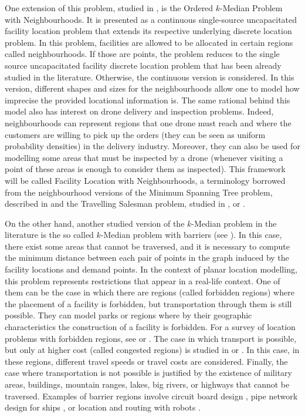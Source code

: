 \documentclass[a4paper,  review, authoryear, 1p.]{elsarticle}
\newcommand{\JP}[1]{{\color{blue}#1}}
\newcommand{\CV}[1]{{\color{blue}#1}}
\begin{document}
	\CV{One extension of this problem, studied in \cite{blanco2019}, is the Ordered $k$-Median Problem with Neighbourhoods. It} is presented as a continuous single-source uncapacitated facility location problem that extends its respective underlying discrete location problem. In this problem, facilities are allowed to be allocated in certain regions called neighbourhoods. If those are points, the problem reduces to the single source uncapacitated facility discrete location problem that has been already studied in the literature. Otherwise, the continuous version is considered. In this version, different shapes and sizes for the neighbourhoods allow one to model how imprecise the provided locational information is. \JP{The same rational behind this model also has interest on drone delivery and inspection problems. Indeed, neighbourhoods can represent regions that one drone must reach and where the customers are willing to pick up the orders (they can be seen as uniform probability densities) in the delivery industry. Moreover, they can also be used for modelling some areas that must be inspected by a drone (whenever visiting a point of these areas is enough to consider them as inspected).} This framework will be called Facility Location with Neighbourhoods, a terminology borrowed from the neighbourhood versions of the Minimum Spanning Tree problem, described in \citet{blanco2017} and the Travelling Salesman problem, studied in \citet{gentilini2013}, \citet{yuan2017} or \citet{puerto2022a}.
	
	\JP{On the other hand, another studied version of the $k$-Median problem in the literature is the so called $k$-Median problem with barriers (see \citet{klamroth2002}). In this case, there exist some areas that cannot be traversed, and it is necessary to compute the minimum distance between each pair of points in the graph induced by the facility locations and demand points. In the context of planar location modelling, this problem represents restrictions that appear in a real-life context. One of them can be the case in which there are regions (called forbidden regions) where the placement of a facility is forbidden, but transportation through them is still possible. They can model parks or regions where by their geographic characteristics the construction of a facility is forbidden. For a survey of location problems with forbidden regions, see \cite{hamacher1995} or \cite{nickel1995}. The case in which transport is possible, but only at higher cost (called congested regions) is studied in \cite{butt1996} or \cite{mitchell1991}. In this case, in these regions, different travel speeds or travel costs are considered. Finally, the case where transportation is not possible is justified by the existence of military areas, buildings, mountain ranges, lakes, big rivers, or highways that cannot be traversed. Examples of barrier regions involve circuit board design \citep{lapaugh1980}, pipe network design for ships \citep{wangdahl1974}, \citep{blanco2022} or location and routing with robots \citep{lozano-perez1979}. }
	
\end{document}
